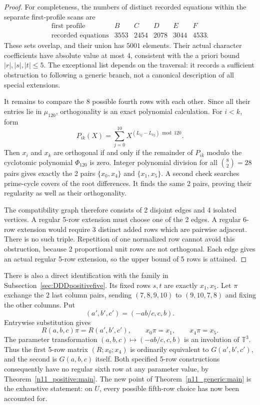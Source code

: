\documentclass[11pt,a4paper]{article}
\theoremstyle{plain}
\theoremstyle{definition}
\theoremstyle{plain}
\begin{document}
\begin{proof}
For completeness, the numbers of distinct recorded equations within the separate first-profile scans are
$$\begin{array}{c|rrrrr}
\text{first profile}&B&C&D&E&F\\\hline
\text{recorded equations}&3553&2454&2078&3044&4533.
\end{array}$$
These sets overlap, and their union has $5001$ elements. Their actual character coefficients have absolute value at most 4, consistent with the a priori bound $|r|,|s|,|t|\le5$. The exceptional list depends on the traversal: it records a sufficient obstruction to following a generic branch, not a canonical description of all special extensions.

\medskip
It remains to compare the 8 possible fourth rows with each other. Since all their entries lie in $\mu_{120}$, orthogonality is an exact polynomial calculation. For $i<k$, form
\[
P_{ik}(X)=\sum_{j=0}^{10}X^{(L_{ij}-L_{kj})\bmod120}.
\]
Then $x_i$ and $x_k$ are orthogonal if and only if the remainder of $P_{ik}$ modulo the cyclotomic polynomial $\Phi_{120}$ is zero. Integer polynomial division for all $\binom82=28$ pairs gives exactly the 2 pairs $\{x_0,x_4\}$ and $\{x_1,x_5\}$. A second check searches prime-cycle covers of the root differences. It finds the same 2 pairs, proving their regularity as well as their orthogonality.

The compatibility graph therefore consists of 2 disjoint edges and 4 isolated vertices. A regular 5-row extension must choose one of the 2 edges. A regular 6-row extension would require 3 distinct added rows which are pairwise adjacent. There is no such triple. Repetition of one normalized row cannot avoid this obstruction, because 2 proportional unit rows are not orthogonal. Each edge gives an actual regular 5-row extension, so the upper bound of 5 rows is attained.
\end{proof}

There is also a direct identification with the family in Subsection~\ref{sec:DDDpositivefive}. Its fixed rows $s,t$ are exactly $x_1,x_5$. Let $\pi$ exchange the 2 last column pairs, sending $(7,8,9,10)$ to $(9,10,7,8)$ and fixing the other columns. Put
\[
(a',b',c')=(-ab/c,c,b).
\]
Entrywise substitution gives
$$R(a,b,c)\pi=R(a',b',c'),\qquad
 x_0\pi=x_1,\qquad x_4\pi=x_5.$$
The parameter transformation $(a,b,c)\mapsto(-ab/c,c,b)$ is an involution of $\mathbb T^3$. Thus the first 5-row matrix $(R;x_0;x_4)$ is ordinarily equivalent to $G(a',b',c')$, and the second is $G(a,b,c)$ itself. Both specified 5-row constructions consequently have no regular sixth row at any parameter value, by Theorem~\ref{n11_positive:main}. The new point of Theorem~\ref{n11_generic:main} is the exhaustive statement: on $U$, every possible fifth-row choice has now been accounted for.
\end{document}
